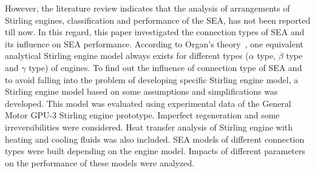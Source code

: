 \documentclass[review,3p,10t]{elsarticle}
\begin{document}
However, the literature review indicates that the analysis of arrangements of Stirling engines, classification and performance of the SEA, has not been reported till now. In this regard, this paper investigated the connection types of SEA and its influence on SEA performance. According to Organ's theory~\cite{Organ1997}, one equivalent analytical Stirling engine model always exists for different types ($\alpha$ type, $\beta$ type and $\gamma$ type) of engines. To find out the influence of connection type of SEA and to avoid falling into the problem of developing specific Stirling engine model, a Stirling engine model based on some assumptions and simplifications was developed. This model was evaluated using experimental data of the General Motor GPU-3 Stirling engine prototype. Imperfect regeneration and some irreversibilities were considered. Heat transfer analysis of Stirling engine with heating and cooling fluids was also included. SEA models of different connection types were built depending on the engine model. Impacts of different parameters on the performance of these models were analyzed.
\end{document}
